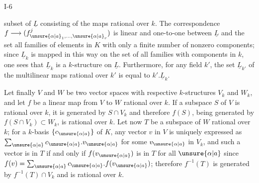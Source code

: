 
I-6

subset of $\underline L$ consisting of the maps rational over $k$. The correspondence $f\longrightarrow(f^j_{\unsure{\alpha|a}_1,\ldots,\unsure{\alpha|a}_r})$ is linear and one-to-one between $\underline L$ and the set all families of elements in $K$ with only a finite number of nonzero components; since $\underline L_k$ is mapped in this way on the set of all families with components in $k$, one sees that $\underline L_k$ is a $k$-structure on $\underline L$. Furthermore, for any field $k'$, the set $\underline L_{k'}$ of the multilinear maps rational over $k'$ is equal to $k'.\underline L_k$.

Let finally $V$ and $W$ be two vector spaces with respective $k$-structures $V_k$ and $W_k$, and let $f$ be a linear map from $V$ to $W$ rational over $k$. If a subspace $S$ of $V$ is rational over $k$, it is generated by $S\cap V_k$ and therefore $f(S)$, being generated by $f(S\cap V_k)\subset W_k$, is rational over $k$. Let now $T$ be a subspace of $W$ rational over $k$; for a $k$-basis $\{c_{\unsure{\alpha|a}}\}$ of $K$, any vector $v$ in $V$ is uniquely expressed as $\sum_{\unsure{\alpha|a}} c_{\unsure{\alpha|a}}.v_{\unsure{\alpha|a}}$ for some $v_{\unsure{\alpha|a}}$ in $V_k$, and such a vector is in $T$ if and only if $f(v_{\unsure{\alpha|a}})$ is in $T$ for all $\unsure{\alpha|a}$ since $f(v)=\sum_{\unsure{\alpha|a}}c_{\unsure{\alpha|a}}.f(v_{\unsure{\alpha|a}})$; therefore $f^{-1}(T)$ is generated by $f^{-1}(T)\cap V_k$ and is rational over $k$.

